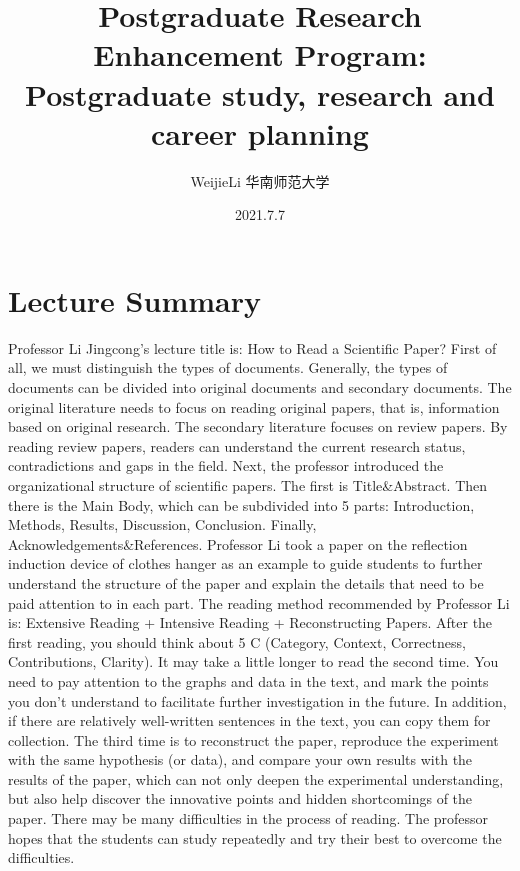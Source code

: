 \documentclass[UTF-8]{ctexart}
\title{Postgraduate Research Enhancement Program: Postgraduate study, research and career planning}
\author{WeijieLi \quad 华南师范大学}
\date{2021.7.7}
\begin{document}
\maketitle
\thispagestyle{empty}
\clearpage

\pagestyle{plain}
\setcounter{page}{1}

\section{Lecture Summary}
Professor Li Jingcong’s lecture title is: How to Read a Scientific Paper? First of all, we must distinguish the types of documents. Generally, the types of documents can be divided into original documents and secondary documents. The original literature needs to focus on reading original papers, that is, information based on original research. The secondary literature focuses on review papers. By reading review papers, readers can understand the current research status, contradictions and gaps in the field. Next, the professor introduced the organizational structure of scientific papers. The first is Title&Abstract. Then there is the Main Body, which can be subdivided into 5 parts: Introduction, Methods, Results, Discussion, Conclusion. Finally, Acknowledgements&References. Professor Li took a paper on the reflection induction device of clothes hanger as an example to guide students to further understand the structure of the paper and explain the details that need to be paid attention to in each part. The reading method recommended by Professor Li is: Extensive Reading + Intensive Reading + Reconstructing Papers. After the first reading, you should think about 5 C (Category, Context, Correctness, Contributions, Clarity). It may take a little longer to read the second time. You need to pay attention to the graphs and data in the text, and mark the points you don't understand to facilitate further investigation in the future. In addition, if there are relatively well-written sentences in the text, you can copy them for collection. The third time is to reconstruct the paper, reproduce the experiment with the same hypothesis (or data), and compare your own results with the results of the paper, which can not only deepen the experimental understanding, but also help discover the innovative points and hidden shortcomings of the paper. There may be many difficulties in the process of reading. The professor hopes that the students can study repeatedly and try their best to overcome the difficulties. 
\end{document}
